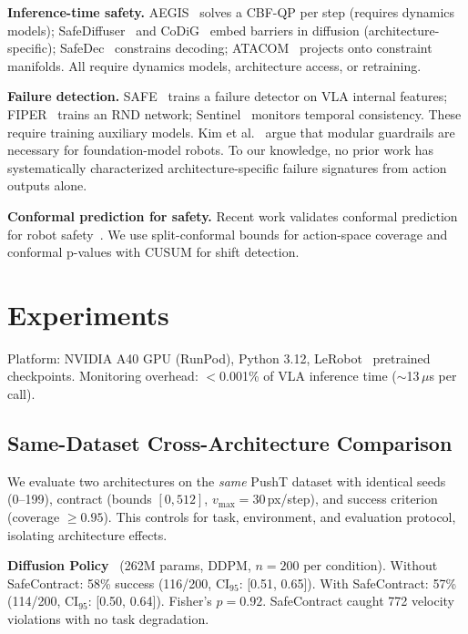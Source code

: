 \documentclass[conference]{IEEEtran}
\begin{document}
\textbf{Inference-time safety.}
AEGIS~\cite{aegis} solves a CBF-QP per step (requires dynamics models); SafeDiffuser~\cite{safediffuser} and CoDiG~\cite{codig} embed barriers in diffusion (architecture-specific); SafeDec~\cite{safedec} constrains decoding; ATACOM~\cite{atacom} projects onto constraint manifolds.
All require dynamics models, architecture access, or retraining.

\textbf{Failure detection.}
SAFE~\cite{safe2025} trains a failure detector on VLA internal features; FIPER~\cite{fiper2025} trains an RND network; Sentinel~\cite{sentinel} monitors temporal consistency.
These require training auxiliary models.
Kim et al.~\cite{kim2026guardrails} argue that modular guardrails are necessary for foundation-model robots.
To our knowledge, no prior work has systematically characterized architecture-specific failure signatures from action outputs alone.

\textbf{Conformal prediction for safety.}
Recent work validates conformal prediction for robot safety~\cite{safe2025,feldman2025}.
We use split-conformal bounds for action-space coverage and conformal p-values with CUSUM for shift detection.

\section{Experiments}

Platform: NVIDIA A40 GPU (RunPod), Python 3.12, LeRobot~\cite{lerobot} pretrained checkpoints.
Monitoring overhead: $<$0.001\% of VLA inference time (${\sim}$13\,$\mu$s per call).

\subsection{Same-Dataset Cross-Architecture Comparison}
\label{sec:crossarch}

We evaluate two architectures on the \emph{same} PushT dataset with identical seeds (0--199), contract (bounds $[0, 512]$, $v_{\max}{=}30$\,px/step), and success criterion (coverage ${\ge}0.95$).
This controls for task, environment, and evaluation protocol, isolating architecture effects.

\textbf{Diffusion Policy}~\cite{diffusionpolicy} (262M params, DDPM, $n{=}200$ per condition).
Without SafeContract: 58\% success (116/200, CI$_{95}$: [0.51, 0.65]).
With SafeContract: 57\% (114/200, CI$_{95}$: [0.50, 0.64]).
Fisher's $p = 0.92$.
SafeContract caught 772 velocity violations with no task degradation.
\end{document}
